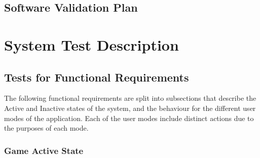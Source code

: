\documentclass[12pt, titlepage]{article}
\begin{document}

\subsection{Software Validation Plan}


\section{System Test Description}
	
\subsection{Tests for Functional Requirements}

The following functional requirements are split into subsections 
that describe the Active and Inactive states of the
system, and the behaviour for the different user modes of the application.
Each of the user modes include distinct actions due to the purposes of each mode. 

  \subsubsection{Game Active State}
  
\end{document}
